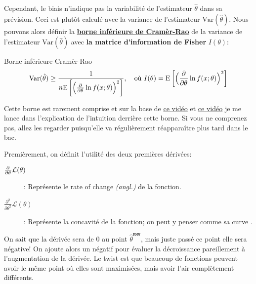 \documentclass[10pt, french]{article}
\begin{document}
\begin{multicols*}{2}
Cependant, le biais n'indique pas la variabilité de l'estimateur $\hat\theta$ dans sa prévision. Ceci est plutôt calculé avec la variance de l'estimateur $\text{Var}(\hat{\theta})$. 
Nous pouvons alors définir la \hyperlink{cramer-rao}{\textbf{borne inférieure de Cramèr-Rao}} de la variance de l'estimateur $\text{Var}(\hat{\theta})$ avec \textbf{la matrice d'information de Fisher} $I(\theta)$:

\begin{algo}{\hypertarget{cramer-rao}{Borne inférieure Cramèr-Rao}}
\begin{align*}
	\text{Var}(\hat{\theta}) \ge \frac{1}{n\text{E}\left[\Big(\deriv{\theta}\ln f(x ; \theta)\Big)^{2}\right]}, \quad \text{où } I(\theta) = \text{E}\left[\Big(\deriv{\theta}\ln f(x ; \theta)\Big)^{2}\right]
\end{align*}
\end{algo}

Cette borne est rarement comprise et sur la base de \hyperlink{https://www.youtube.com/watch?v=igQIsYAlKlY}{ce vidéo} et \hyperlink{https://www.youtube.com/watch?v=i0JiSddCXMM}{ce vidéo} je me lance dans l'explication de l'intuition derrière cette borne. Si vous ne comprenez pas, allez les regarder puisqu'elle va régulièrement réapparaître plus tard dans le bac.

Premièrement, on définit l'utilité des deux premières dérivées:
\begin{description}
	\item[$\deriv{\theta} \mathcal{L}(\theta)$]: Représente le \og rate of change \fg{} \textit{(angl.)} de la fonction.
	\item[$\frac{\partial^{2}}{\partial\theta^{2}} \mathcal{L}(\theta)$]: Représente la concavité de la fonction; on peut y penser comme sa \og curve \fg{}.
\end{description}

On sait que la dérivée sera de 0 au point $\hat\theta^{\texttt{EMV}}$, mais juste passé ce point elle sera négative! On ajoute alors un négatif pour évaluer la décroissance pareillement à l'augmentation de la dérivée. Le twist est que beaucoup de fonctions peuvent avoir le même point où elles sont maximisées, mais avoir l'air complètement différents. 


\begin{tikzpicture}[x=0.75pt,y=0.75pt,yscale=-1,xscale=1]


\end{tikzpicture}
\end{multicols*}
\end{document}

